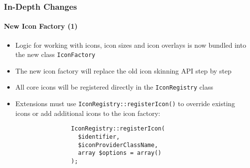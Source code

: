 \begin{frame}[fragile]
	\frametitle{In-Depth Changes}
	\framesubtitle{New Icon Factory (1)}

	\lstset{basicstyle=\smaller\ttfamily}

	\begin{itemize}

		\item Logic for working with icons, icon sizes and icon overlays is now bundled into
			the new class \texttt{IconFactory}

		\item The new icon factory will replace the old icon skinning API step by step

		\item All core icons will be registered directly in the \texttt{IconRegistry} class

		\item Extensions must use \texttt{IconRegistry::registerIcon()} to override existing
			icons or add additional icons to the icon factory:

			\begin{lstlisting}
				IconRegistry::registerIcon(
				  $identifier,
				  $iconProviderClassName,
				  array $options = array()
				);
			\end{lstlisting}

	\end{itemize}

\end{frame}


